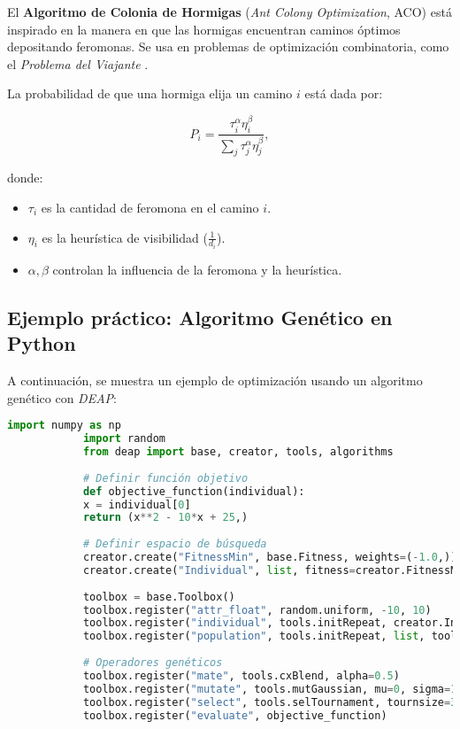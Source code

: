 \begin{itemize}
		El \textbf{Algoritmo de Colonia de Hormigas} (\textit{Ant Colony Optimization}, ACO) está inspirado en la manera en que las hormigas encuentran caminos óptimos depositando feromonas. Se usa en problemas de optimización combinatoria, como el \textit{Problema del Viajante} \cite{dorigo1996ant}.
		
		La probabilidad de que una hormiga elija un camino \( i \) está dada por:
		
		\begin{equation}
			P_i = \frac{\tau_i^\alpha \eta_i^\beta}{\sum_j \tau_j^\alpha \eta_j^\beta},
		\end{equation}
		
		donde:
		\begin{itemize}
			\item \( \tau_i \) es la cantidad de feromona en el camino \( i \).
			\item \( \eta_i \) es la heurística de visibilidad (\( \frac{1}{d_i} \)).
			\item \( \alpha, \beta \) controlan la influencia de la feromona y la heurística.
		\end{itemize}
		
		\subsection{Ejemplo práctico: Algoritmo Genético en Python}
		
		A continuación, se muestra un ejemplo de optimización usando un algoritmo genético con \textit{DEAP}:
		
		\begin{lstlisting}[language=Python, caption={Optimización con Algoritmo Genético en Python}]
			import numpy as np
			import random
			from deap import base, creator, tools, algorithms
			
			# Definir función objetivo
			def objective_function(individual):
			x = individual[0]
			return (x**2 - 10*x + 25,)
			
			# Definir espacio de búsqueda
			creator.create("FitnessMin", base.Fitness, weights=(-1.0,))
			creator.create("Individual", list, fitness=creator.FitnessMin)
			
			toolbox = base.Toolbox()
			toolbox.register("attr_float", random.uniform, -10, 10)
			toolbox.register("individual", tools.initRepeat, creator.Individual, toolbox.attr_float, n=1)
			toolbox.register("population", tools.initRepeat, list, toolbox.individual)
			
			# Operadores genéticos
			toolbox.register("mate", tools.cxBlend, alpha=0.5)
			toolbox.register("mutate", tools.mutGaussian, mu=0, sigma=1, indpb=0.2)
			toolbox.register("select", tools.selTournament, tournsize=3)
			toolbox.register("evaluate", objective_function)
			

\end{lstlisting}
\end{itemize}
